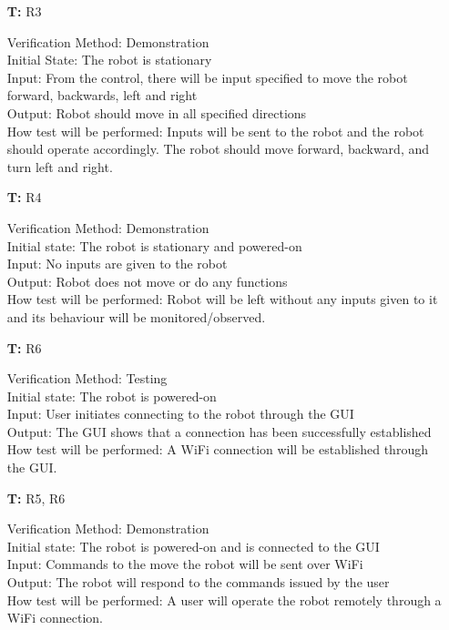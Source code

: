 \documentclass[12pt, titlepage]{article}
\newcounter{tnum} %
\begin{document}
\begin{itemize}
\item[\textbf{T\refstepcounter{tnum}\thetnum:}]{R3\\}

Verification Method: Demonstration\\
Initial State: The robot is stationary \\
Input: From the control, there will be input specified to move the robot forward, backwards, left and right \\
Output: Robot should move in all specified directions \\
How test will be performed: Inputs will be sent to the robot and the robot should operate accordingly. The robot should move forward, backward, and turn left and right. \\

\item[\textbf{T\refstepcounter{tnum}\thetnum:}]{R4\\}

Verification Method: Demonstration\\
Initial state: The robot is stationary and powered-on \\
Input: No inputs are given to the robot \\
Output: Robot does not move or do any functions \\
How test will be performed: Robot will be left without any inputs given to it and its behaviour will be monitored/observed. \\


\item[\textbf{T\refstepcounter{tnum}\thetnum:}]{R6\\}
 
Verification Method: Testing	\\
Initial state: The robot is powered-on \\
Input: User initiates connecting to the robot through the GUI\\
Output: The GUI shows that a connection has been successfully established  \\
How test will be performed: A WiFi connection will be established through the GUI. \\

\item[\textbf{T\refstepcounter{tnum}\thetnum:}]{R5, R6\\}

Verification Method: Demonstration	\\
Initial state: The robot is powered-on and is connected to the GUI \\
Input: Commands to the move the robot will be sent over WiFi \\
Output: The robot will respond to the commands issued by the user  \\
How test will be performed: A user will operate the robot remotely through a WiFi connection.\\


\end{itemize}
\end{document}
